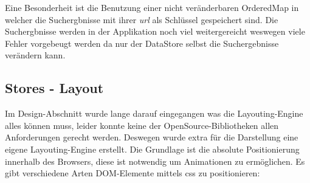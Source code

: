 \documentclass[12pt,twoside]{book}
\begin{document}
Eine Besonderheit ist die Benutzung einer nicht veränderbaren OrderedMap in welcher die Suchergbnisse mit ihrer \textit{url} als Schlüssel gespeichert sind. Die Suchergbnisse werden in der Applikation noch viel weitergereicht weswegen viele Fehler vorgebeugt werden da nur der DataStore selbst die Suchergebnisse verändern kann.

\subsection{Stores - Layout}

Im Design-Abschnitt wurde lange darauf eingegangen was die Layouting-Engine alles können muss, leider konnte keine der OpenSource-Bibliotheken allen Anforderungen gerecht werden. Deswegen wurde extra für die Darstellung eine eigene Layouting-Engine erstellt.
Die Grundlage ist die absolute Positionierung innerhalb des Browsers, diese ist notwendig um Animationen zu ermöglichen. Es gibt verschiedene Arten DOM-Elemente mittels css zu positionieren:
\end{document}
